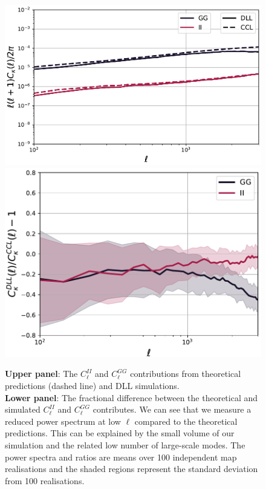 \documentclass{aa}
\begin{document}
\begin{figure}
    \centering
    \includegraphics[width=0.95\columnwidth]{paper/figures/IA_validation.pdf}
    \includegraphics[width=\columnwidth]{paper/figures/IA_validation_res.pdf}
    \caption{ \textbf{Upper panel}: The $C_{\ell}^{II}$ and $C_{\ell}^{GG}$ contributions from theoretical predictions (dashed line) and DLL simulations. \\
     \textbf{Lower panel}: The fractional difference between the theoretical and simulated $C_{\ell}^{II}$ and $C_{\ell}^{GG}$ contributes.
     We can see that we measure a reduced power spectrum at low $\ell$ compared to the theoretical predictions. This can be explained by the small volume of our simulation and the related low number of large-scale modes.
     The power spectra and ratios are means over 100 independent map realisations and the shaded regions represent the standard deviation from 100 realisations.}
    \label{fig:ia_validation}
\end{figure}
\end{document}
